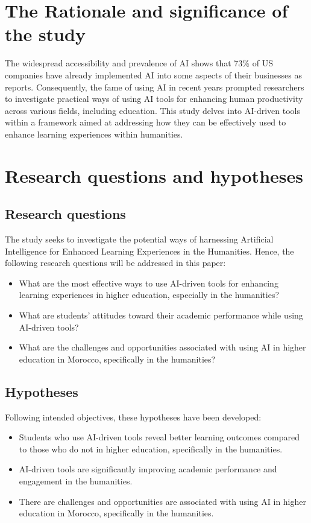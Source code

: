 \section{The Rationale and significance of the study}\label{sec:the-rationale-and-significance-of-the-study}
\justifying
The widespread accessibility and prevalence of AI shows that 73\% of US companies have already
implemented AI into some aspects of their businesses as \textcite{pricewaterhousecoopers} reports.
Consequently, the fame of using AI in recent years prompted researchers to investigate practical
ways of using AI tools for enhancing human productivity across various fields,
including education.
This study delves into AI-driven tools within a framework aimed at addressing
how they can be effectively used to enhance learning experiences within humanities.

\section{Research questions and hypotheses}\label{sec:research-questions-and-hypotheses}
\subsection{Research questions}\label{subsec:research-questions}
\justifying
The study seeks to investigate the potential ways
of harnessing Artificial Intelligence for
Enhanced Learning Experiences in the Humanities.
Hence,
the following research questions will be addressed in this paper:
\begin{itemize}
      \item What are the most effective ways to use AI-driven
            tools for enhancing learning experiences in higher education,
            especially in the humanities?
      \item What are students’ attitudes toward their academic performance
      while using AI-driven tools?
      \item What are the challenges and opportunities associated
            with using AI in higher education in Morocco,
            specifically in the humanities?
\end{itemize}
\subsection{Hypotheses}\label{subsec:hypotheses}
\justifying
\noindent
Following intended objectives, these hypotheses have been developed:
\begin{itemize}
      \item Students who use AI-driven tools reveal better learning outcomes
            compared to those who do not in higher education, specifically in the humanities.
      \item AI-driven tools are significantly improving academic
            performance and engagement in the humanities.
      \item There are challenges and opportunities are associated with using AI in higher
            education in Morocco, specifically in the humanities.
\end{itemize}

